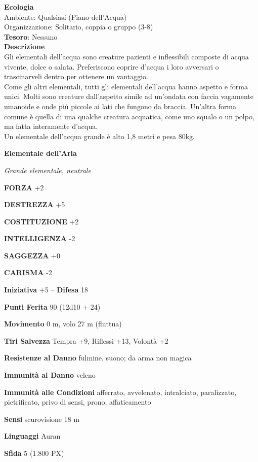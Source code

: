 \begin{multicols}{2}
	\textbf{Ecologia}\\
	Ambiente: Qualsiasi (Piano dell'Acqua)\\
	Organizzazione: Solitario, coppia o gruppo (3-8)\\
	\textbf{Tesoro}: Nessuno\\
	\textbf{Descrizione}\\
	Gli elementali dell'acqua sono creature pazienti e inflessibili composte di acqua vivente, dolce o salata. Preferiscono coprire d'acqua i loro avversari o trascinarveli dentro per ottenere un vantaggio.\\
	Come gli altri elementali, tutti gli elementali dell'acqua hanno aspetto e forma unici. Molti sono creature dall'aspetto simile ad un'ondata con faccia vagamente umanoide e onde più piccole ai lati che fungono da braccia. Un'altra forma comune è quella di una qualche creatura acquatica, come uno squalo o un polpo, ma fatta interamente d'acqua.\\
	Un elementale dell'acqua grande è alto 1,8 metri e pesa 80kg.

	\medskip{}\textbf{Elementale dell'Aria}

	\textit{Grande elementale, neutrale}

	\textbf{FORZA} +2

	\textbf{DESTREZZA} +5

	\textbf{COSTITUZIONE} +2

	\textbf{INTELLIGENZA} -2

	\textbf{SAGGEZZA} +0

	\textbf{CARISMA} -2

	\textbf{Iniziativa} +5 -- \textbf{Difesa} 18

	\textbf{Punti Ferita} 90 (12d10 + 24)

	\textbf{Movimento} 0 m, volo 27 m (fluttua)

	\textbf{Tiri Salvezza} Tempra +9, Riflessi +13, Volontà +2

	\textbf{Resistenze al Danno} fulmine, suono; da arma non magica

	\textbf{Immunità al Danno} veleno

	\textbf{Immunità alle Condizioni} afferrato, avvelenato, intralciato, paralizzato, pietrificato, privo di sensi, prono, affaticamento

	\textbf{Sensi} scurovisione 18 m

	\textbf{Linguaggi} Auran

	\textbf{Sfida} 5 (1.800 PX)


\end{multicols}
